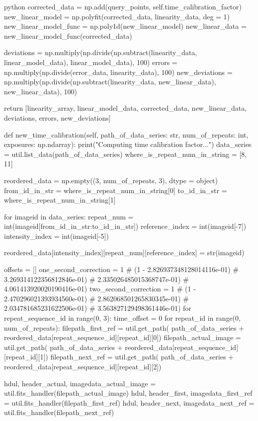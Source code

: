 \documentclass[../main.tex]{subfiles}
\begin{document}
\begin{mintedbox}{python}
corrected_data  =  np.add(query_points, self.time_calibration_factor)
new_linear_model  =  np.polyfit(corrected_data, linearity_data, deg = 1)
new_linear_model_func  =  np.poly1d(new_linear_model)
new_linear_data  =  new_linear_model_func(corrected_data)

deviations  =  np.multiply(np.divide(np.subtract(linearity_data, linear_model_data), linear_model_data), 100)
errors  =  np.multiply(np.divide(error_data, linearity_data), 100)
new_deviations  =  np.multiply(np.divide(np.subtract(linearity_data, new_linear_data), new_linear_data), 100)

return [linearity_array, linear_model_data, corrected_data, new_linear_data, deviations, errors, new_deviations]

def new_time_calibration(self, path_of_data_series: str, num_of_repeats: int, exposures: np.ndarray):
print("Computing time calibration factor...")
data_series  =  util.list_data(path_of_data_series)
where_is_repeat_num_in_string  =  [8, 11]

reordered_data  =  np.empty((3, num_of_repeats, 3), dtype = object)
from_id_in_str  =  where_is_repeat_num_in_string[0]
to_id_in_str  =  where_is_repeat_num_in_string[1]

for imageid in data_series:
repeat_num  =  int(imageid[from_id_in_str:to_id_in_str])
reference_index  =  int(imageid[-7])
intensity_index  =  int(imageid[-5])

reordered_data[intensity_index][repeat_num][reference_index]  =  str(imageid)

offsets  =  []
one_second_correction  =  1  # (1 - 2.826937348128014116e-01)  # 3.269314122356812846e-01)  # 2.335026485015368747e-01)  # 4.061413920020190416e-01)
two_second_correction  =  1  # (1 - 2.470296021393934560e-01)  # 2.862068501265830345e-01)  # 2.034781685231622506e-01)  # 3.563827129498361446e-01)
for repeat_sequence_id in range(0, 3):
time_offset  =  0
for repeat_id in range(0, num_of_repeats):
filepath_first_ref  =  util.get_path(
path_of_data_series + reordered_data[repeat_sequence_id][repeat_id][0])
filepath_actual_image  =  util.get_path(
path_of_data_series + reordered_data[repeat_sequence_id][repeat_id][1])
filepath_next_ref  =  util.get_path(
path_of_data_series + reordered_data[repeat_sequence_id][repeat_id][2])

hdul, header_actual, imagedata_actual_image  =  util.fits_handler(filepath_actual_image)
hdul, header_first, imagedata_first_ref  =  util.fits_handler(filepath_first_ref)
hdul, header_next, imagedata_next_ref  =  util.fits_handler(filepath_next_ref)


\end{mintedbox}
\end{document}
